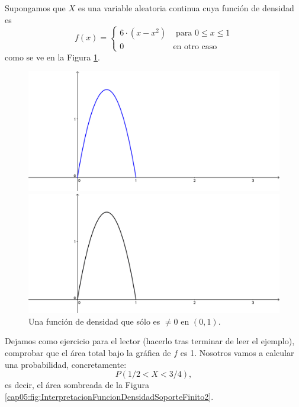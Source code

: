 \begin{ejemplo}
\label{cap05:ejem:FuncionDensidadSoporteFinito}
    Supongamos que $X$ es una variable aleatoria continua cuya función de densidad es
    \[f(x)=\begin{cases}6\cdot(x-x^2)&\mbox{ para }0\leq x\leq 1\\ 0&\mbox{en otro caso}\end{cases}\]
    como se ve en la Figura \ref{cap05:fig:InterpretacionFuncionDensidadSoporteFinito}.

\begin{figure}[htbp]
\begin{center}
\begin{enColor}
\includegraphics[width=12cm]{../fig/Cap05-InterpretacionFuncionDensidadSoporteFinito.png}
\end{enColor}
\begin{bn}
\includegraphics[width=12cm]{../fig/Cap05-InterpretacionFuncionDensidadSoporteFinito-bn.png}
\end{bn}
\caption{Una función de densidad que sólo es $\neq 0$ en $(0,1)$.}
\label{cap05:fig:InterpretacionFuncionDensidadSoporteFinito}
\end{center}
\end{figure}

    Dejamos como ejercicio para el lector (hacerlo tras terminar de leer el ejemplo), comprobar que el área total bajo la gráfica de $f$ es 1.  Nosotros vamos a calcular una probabilidad, concretamente:
    \[P(1/2<X<3/4),\]
    es decir, el área sombreada de la Figura \ref{cap05:fig:InterpretacionFuncionDensidadSoporteFinito2}.


\end{ejemplo}
